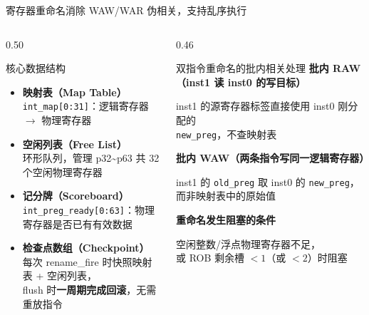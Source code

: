 \documentclass[aspectratio=169,xcolor={dvipsnames,svgnames},10pt]{beamer}
\newcommand{\hl}[1]{\textcolor{AccentOrange}{\textbf{#1}}}
\newcommand{\code}[1]{\texttt{\small\color{PrimaryBlue}#1}}
\begin{document}
\begin{frame}{寄存器重命名}{消除 WAW/WAR 伪相关，支持乱序执行}
  \begin{columns}[T]
    \begin{column}{0.50\textwidth}
      \begin{block}{核心数据结构}
        \small
        \begin{itemize}
          \item \textbf{映射表（Map Table）}\\
                \code{int\_map[0:31]}：逻辑寄存器 $\to$ 物理寄存器
          \item \textbf{空闲列表（Free List）}\\
                环形队列，管理 p32\textasciitilde p63 共 32 个空闲物理寄存器
          \item \textbf{记分牌（Scoreboard）}\\
                \code{int\_preg\_ready[0:63]}：物理寄存器是否已有有效数据
          \item \textbf{检查点数组（Checkpoint）}\\
                每次 rename\_fire 时快照映射表 + 空闲列表，\\
                flush 时\hl{一周期完成回滚}，无需重放指令
        \end{itemize}
      \end{block}
    \end{column}
    \begin{column}{0.46\textwidth}
      \begin{block}{双指令重命名的批内相关处理}
        \small
        \textbf{批内 RAW（inst1 读 inst0 的写目标）}

        inst1 的源寄存器标签直接使用 inst0 刚分配的\\
        \code{new\_preg}，不查映射表

        \vspace{0.2cm}
        \textbf{批内 WAW（两条指令写同一逻辑寄存器）}

        inst1 的 \code{old\_preg} 取 inst0 的 \code{new\_preg}，\\
        而非映射表中的原始值

        \vspace{0.2cm}
        \textbf{重命名发生阻塞的条件}

        空闲整数/浮点物理寄存器不足，\\
        或 ROB 剩余槽 $< 1$（或 $<2$）时阻塞
      \end{block}
    \end{column}
  \end{columns}
\end{frame}
\end{document}
